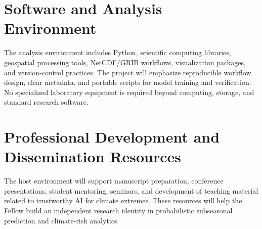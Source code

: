 \documentclass[11pt,letterpaper]{article}
\begin{document}
\section*{Software and Analysis Environment}
The analysis environment includes Python, scientific computing libraries, geospatial processing tools, NetCDF/GRIB workflows, visualization packages, and version-control practices. The project will emphasize reproducible workflow design, clear metadata, and portable scripts for model training and verification. No specialized laboratory equipment is required beyond computing, storage, and standard research software.

\section*{Professional Development and Dissemination Resources}
The host environment will support manuscript preparation, conference presentations, student mentoring, seminars, and development of teaching material related to trustworthy AI for climate extremes. These resources will help the Fellow build an independent research identity in probabilistic subseasonal prediction and climate-risk analytics.
\end{document}
